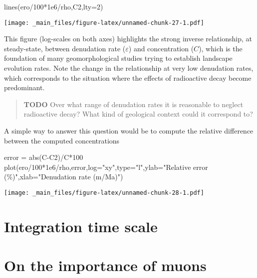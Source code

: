 \documentclass[
]{book}
\newenvironment{Shaded}{\begin{snugshade}}{\end{snugshade}}
\newcommand{\AttributeTok}[1]{\textcolor[rgb]{0.77,0.63,0.00}{#1}}
\newcommand{\DecValTok}[1]{\textcolor[rgb]{0.00,0.00,0.81}{#1}}
\newcommand{\FloatTok}[1]{\textcolor[rgb]{0.00,0.00,0.81}{#1}}
\newcommand{\FunctionTok}[1]{\textcolor[rgb]{0.00,0.00,0.00}{#1}}
\newcommand{\NormalTok}[1]{#1}
\newcommand{\OtherTok}[1]{\textcolor[rgb]{0.56,0.35,0.01}{#1}}
\newcommand{\SpecialCharTok}[1]{\textcolor[rgb]{0.00,0.00,0.00}{#1}}
\newcommand{\StringTok}[1]{\textcolor[rgb]{0.31,0.60,0.02}{#1}}
\begin{document}
\begin{Shaded}
\begin{Highlighting}[]
\FunctionTok{lines}\NormalTok{(ero}\SpecialCharTok{/}\DecValTok{100}\SpecialCharTok{*}\FloatTok{1e6}\SpecialCharTok{/}\NormalTok{rho,C2,}\AttributeTok{lty=}\DecValTok{2}\NormalTok{)}
\end{Highlighting}
\end{Shaded}

\texttt{[image: \_main\_files/figure-latex/unnamed-chunk-27-1.pdf]}

This figure (log-scales on both axes) highlights the strong inverse relationship, at steady-state, between denudation rate (\(\varepsilon\)) and concentration (\(C\)), which is the foundation of many geomorphological studies trying to establish landscape evolution rates.
Note the change in the relationship at very low denudation rates, which corresponds to the situation where the effects of radioactive decay become predominant.

\begin{quote}
\textbf{TODO} Over what range of denudation rates it is reasonable to neglect radioactive decay? What kind of geological context could it correspond to?
\end{quote}

A simple way to answer this question would be to compute the relative difference between the computed concentrations

\begin{Shaded}
\begin{Highlighting}[]
\NormalTok{error }\OtherTok{=} \FunctionTok{abs}\NormalTok{(C}\SpecialCharTok{{-}}\NormalTok{C2)}\SpecialCharTok{/}\NormalTok{C}\SpecialCharTok{*}\DecValTok{100}
\FunctionTok{plot}\NormalTok{(ero}\SpecialCharTok{/}\DecValTok{100}\SpecialCharTok{*}\FloatTok{1e6}\SpecialCharTok{/}\NormalTok{rho,error,}\AttributeTok{log=}\StringTok{"xy"}\NormalTok{,}\AttributeTok{type=}\StringTok{"l"}\NormalTok{,}\AttributeTok{ylab=}\StringTok{"Relative error (\%)"}\NormalTok{,}\AttributeTok{xlab=}\StringTok{"Denudation rate (m/Ma)"}\NormalTok{)}
\end{Highlighting}
\end{Shaded}

\texttt{[image: \_main\_files/figure-latex/unnamed-chunk-28-1.pdf]}

\hypertarget{integration-time-scale}{%
\section{Integration time scale}\label{integration-time-scale}}

\hypertarget{on-the-importance-of-muons}{%
\section{On the importance of muons}\label{on-the-importance-of-muons}}
\end{document}
